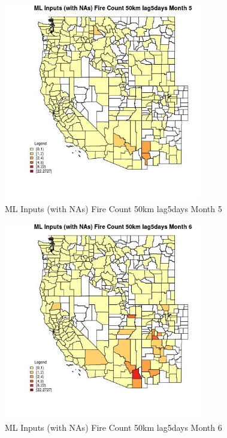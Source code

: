 \begin{figure} 
\centering  
\includegraphics[width=0.77\textwidth]{Code_Outputs/Report_ML_input_PM25_Step4_part_f_de_duplicated_aves_prioritize_24hr_obswNAs_CountyFire_Count_50km_lag5daysmedianMonth5.jpg} 
\caption{\label{fig:Report_ML_input_PM25_Step4_part_f_de_duplicated_aves_prioritize_24hr_obswNAsCountyFire_Count_50km_lag5daysmedianMonth5}ML Inputs (with NAs) Fire Count 50km lag5days Month 5} 
\end{figure} 
 

\begin{figure} 
\centering  
\includegraphics[width=0.77\textwidth]{Code_Outputs/Report_ML_input_PM25_Step4_part_f_de_duplicated_aves_prioritize_24hr_obswNAs_CountyFire_Count_50km_lag5daysmedianMonth6.jpg} 
\caption{\label{fig:Report_ML_input_PM25_Step4_part_f_de_duplicated_aves_prioritize_24hr_obswNAsCountyFire_Count_50km_lag5daysmedianMonth6}ML Inputs (with NAs) Fire Count 50km lag5days Month 6} 
\end{figure} 
 

